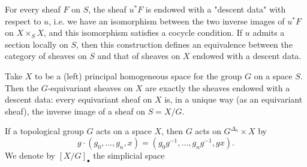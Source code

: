     For every sheaf \(F\) on \(S\), the sheaf \(u^*F\) is endowed with a "descent data" with respect to \(u\), i.e. we have an isomorphism between the two inverse images of \(u^*F\) on \(X\times _S X\), and this isomorphism satisfies a cocycle condition.
    If \(u\) admits a section locally on \(S\), then this construction defines an equivalence between the category of sheaves on \(S\) and that of sheaves on \(X\) endowed with a descent data.\par{}Take \(X\) to be a (left) principal homogeneous space for the group \(G\) on a space \(S\).
    Then the \(G\)-equivariant sheaves on \(X\) are exactly the sheaves endowed with a descent data: every equivariant sheaf on \(X\) is, in a unique way (as an equivariant sheaf), the inverse image of a sheaf on \(S=X/G\).\label{hodge-theory-iii-6.1.2}\par{}If a topological group \(G\) acts on a space \(X\), then \(G\) acts on \(G^{\Delta _n}\times  X\) by
    \[       g\cdot (g_0,\ldots ,g_n,x)       = (g_0g^{-1},\ldots ,g_ng^{-1},gx).     \]
    We denote by \([X/G]_\bullet \) the simplicial space

